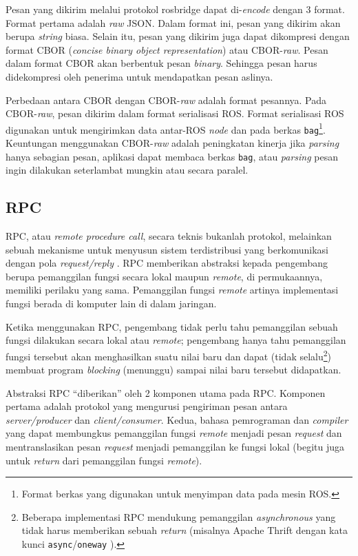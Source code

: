 Pesan yang dikirim melalui protokol rosbridge dapat di-\textit{encode} dengan 3
format. Format pertama adalah \textit{raw} JSON. Dalam format ini, pesan yang
dikirim akan berupa \textit{string} biasa. Selain itu, pesan yang dikirim juga
dapat dikompresi dengan format CBOR (\textit{concise binary object
    representation}) atau CBOR-\textit{raw}. Pesan dalam format CBOR akan
berbentuk pesan \textit{binary}. Sehingga pesan harus didekompresi oleh
penerima untuk mendapatkan pesan aslinya.

Perbedaan antara CBOR dengan CBOR-\textit{raw} adalah format pesannya. Pada
CBOR-\textit{raw}, pesan dikirim dalam format serialisasi ROS. Format
serialisasi ROS digunakan untuk mengirimkan data antar-ROS \textit{node} dan
pada berkas \texttt{bag}\footnote{Format berkas yang digunakan untuk menyimpan
    data pada mesin ROS.}. Keuntungan menggunakan CBOR-\textit{raw} adalah
peningkatan kinerja jika \textit{parsing} hanya sebagian pesan, aplikasi dapat
membaca berkas \texttt{bag}, atau \textit{parsing} pesan ingin dilakukan
seterlambat mungkin atau secara paralel.

\subsection{RPC}

RPC, atau \textit{remote procedure call}, secara teknis bukanlah protokol,
melainkan sebuah mekanisme untuk menyusun sistem terdistribusi yang
berkomunikasi dengan pola \textit{request/reply}
\parencite{larry_computerNetwork}. RPC memberikan abstraksi kepada pengembang
berupa pemanggilan fungsi secara lokal maupun \textit{remote}, di permukaannya,
memiliki perilaku yang sama. Pemanggilan fungsi \textit{remote} artinya
implementasi fungsi berada di komputer lain di dalam jaringan.

Ketika menggunakan RPC, pengembang tidak perlu tahu pemanggilan sebuah fung\-si
dilakukan secara lokal atau \textit{remote}; pengembang hanya tahu pemanggilan
fungsi tersebut akan menghasilkan suatu nilai baru dan dapat (tidak
selalu\footnote{Beberapa implementasi RPC mendukung pemanggilan
    \textit{asynchronous} yang tidak harus memberikan sebuah \textit{return}
    (misalnya Apache Thrift dengan kata kunci \texttt{async}/\texttt{oneway}
    \parencite{agarwal_thrift}).})
membuat program \textit{blocking} (menunggu) sampai nilai baru tersebut
didapatkan.

Abstraksi RPC ``diberikan'' oleh 2 komponen utama pada RPC. Komponen pertama
adalah protokol yang mengurusi pengiriman pesan antara \textit{server/producer}
dan \textit{client/consumer}. Kedua, bahasa pemrograman dan \textit{compiler}
yang dapat membungkus pemanggilan fungsi \textit{remote} menjadi pesan
\textit{request} dan mentranslasikan pesan \textit{request} menjadi pemanggilan
ke fungsi lokal (begitu juga untuk \textit{return} dari pemanggilan fungsi
\textit{remote}).

